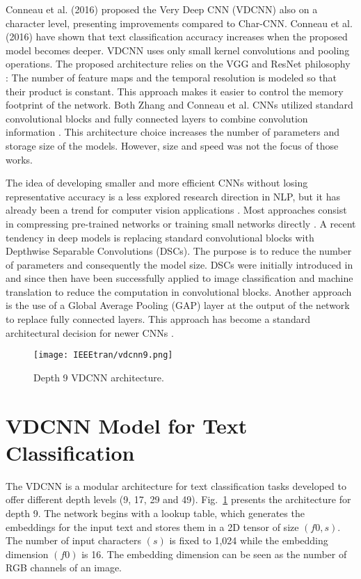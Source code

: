 \documentclass[conference]{IEEEtran}
\begin{document}
Conneau et al. (2016) proposed the Very Deep CNN (VDCNN) \cite{conneau2016very} also on a character level, presenting improvements compared to Char-CNN. Conneau et al. (2016) have shown that text classification accuracy increases when the proposed model becomes deeper. VDCNN uses only small kernel convolutions and pooling operations. The proposed architecture relies on the VGG and ResNet philosophy \cite{he2016deep,simonyan2014very}: The number of feature maps and the temporal resolution is modeled so that their product is constant.  This approach makes it easier to control the memory footprint of the network. Both Zhang and Conneau et al. CNNs utilized standard convolutional blocks and fully connected layers to combine convolution information \cite{zhang2015character, conneau2016very}. This architecture choice increases the number of parameters and storage size of the models. However, size and speed was not the focus of those works. 

The idea of developing smaller and more efficient CNNs without losing representative accuracy is a less explored research direction in NLP, but it has already been a trend for computer vision applications \cite{howard2017mobilenets,iandola2016squeezenet,santos2018reducing }.  Most approaches consist in compressing pre-trained networks or training small networks directly \cite{howard2017mobilenets}. A recent tendency in deep models is replacing standard convolutional blocks with Depthwise Separable Convolutions (DSCs). The purpose is to reduce the number of parameters and consequently the model size. DSCs were initially introduced in \cite{sifre2014rigid} and since then have been successfully applied to image classification and  \cite{howard2017mobilenets,santos2018reducing,chollet2017xception} machine translation \cite{kaiser2017depthwise} to reduce the computation in convolutional blocks.  Another approach is the use of a Global Average Pooling (GAP) layer at the output of the network to replace fully connected layers. This approach has become a standard architectural decision for newer CNNs \cite{he2016deep,huang2017densely}.

\begin{figure}[htbp]
\centering
\texttt{[image: IEEEtran/vdcnn9.png]}
\caption{Depth 9 VDCNN architecture.}
\label{vdcnn}
\end{figure}
 
\section{VDCNN Model for Text Classification}
The VDCNN is a modular architecture for text classification tasks developed to offer different depth levels (9, 17, 29 and 49). Fig.~\ref{vdcnn} presents the architecture for depth 9. The network begins with a lookup table, which generates the embeddings for the input text and stores them in a 2D tensor of size $(f0, s)$. The number of input characters $(s)$ is fixed to 1,024 while the embedding dimension $(f0)$ is 16. The embedding dimension can be seen as the number of RGB channels of an image. 
\end{document}
